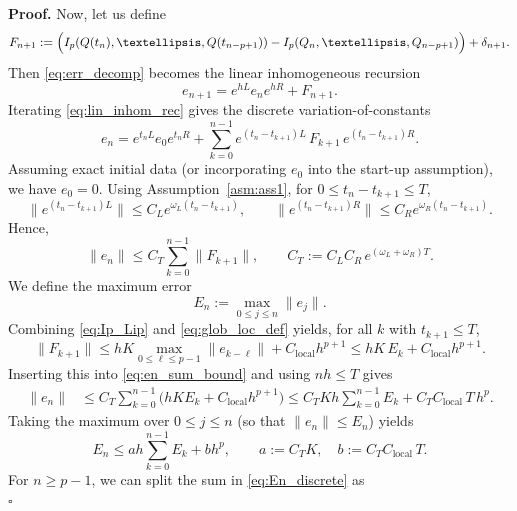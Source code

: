 \documentclass[12pt]{article}
\newenvironment{pf}{\noindent\textbf{Proof.}}{\hfill$\square$}
\begin{document}
\begin{pf}
Now, let us define 
\begin{equation*}
F_{n+1}
:= \Bigl(I_p(Q(t_n),\ldots,Q(t_{n-p+1}))-I_p(Q_n,\ldots,Q_{n-p+1})\Bigr)+\delta_{n+1}.
\end{equation*}
Then \eqref{eq:err_decomp} becomes the linear inhomogeneous recursion
\begin{equation}\label{eq:lin_inhom_rec}
e_{n+1}=e^{hL}e_ne^{hR}+F_{n+1}.
\end{equation}
Iterating \eqref{eq:lin_inhom_rec} gives the discrete variation-of-constants
\begin{equation*}
e_n
= e^{t_nL}e_0e^{t_nR}
 + \sum_{k=0}^{n-1} e^{(t_n-t_{k+1})L}\,F_{k+1}\,e^{(t_n-t_{k+1})R}.
\end{equation*}
Assuming exact initial data (or incorporating $e_0$ into the start-up assumption), we have $e_0=0$.
Using Assumption~\ref{asm:ass1}, for $0\le t_n-t_{k+1}\le T$,
\begin{equation*}
\|e^{(t_n-t_{k+1})L}\|\le C_L e^{\omega_L (t_n-t_{k+1})},\qquad
\|e^{(t_n-t_{k+1})R}\|\le C_R e^{\omega_R (t_n-t_{k+1})}.
\end{equation*}
Hence,
\begin{equation}\label{eq:en_sum_bound}
\|e_n\|
\le C_T\sum_{k=0}^{n-1}\|F_{k+1}\|,
\qquad
C_T:=C_LC_R\,e^{(\omega_L+\omega_R)T}.
\end{equation}
We define the maximum error
\begin{equation*}
   E_n:=\max_{0\le j\le n}\|e_j\|. 
\end{equation*}
Combining \eqref{eq:Ip_Lip} and \eqref{eq:glob_loc_def} yields, for all $k$ with $t_{k+1}\le T$,
\begin{equation*}
\|F_{k+1}\|\le hK\max_{0\le\ell\le p-1}\|e_{k-\ell}\| + C_{\mathrm{local}}h^{p+1}
\le hK\,E_k + C_{\mathrm{local}}h^{p+1}.
\end{equation*}
Inserting this into \eqref{eq:en_sum_bound} and using $nh\le T$ gives
\begin{align*}
\|e_n\|
&\le C_T\sum_{k=0}^{n-1}\bigl(hK E_k + C_{\mathrm{local}}h^{p+1}\bigr)
\le C_TK h\sum_{k=0}^{n-1}E_k + C_T C_{\mathrm{local}}\,T\,h^p.
\end{align*}
Taking the maximum over $0\le j\le n$ (so that $\|e_n\|\le E_n$) yields
\begin{equation}\label{eq:En_discrete}
E_n \le a h\sum_{k=0}^{n-1}E_k + b h^p,
\qquad
a:=C_TK,\quad b:=C_T C_{\mathrm{local}}\,T.
\end{equation}
For $n\ge p-1$, we can split the sum in \eqref{eq:En_discrete} as
\begin{equation*}

\end{equation*}
\end{pf}
\end{document}
